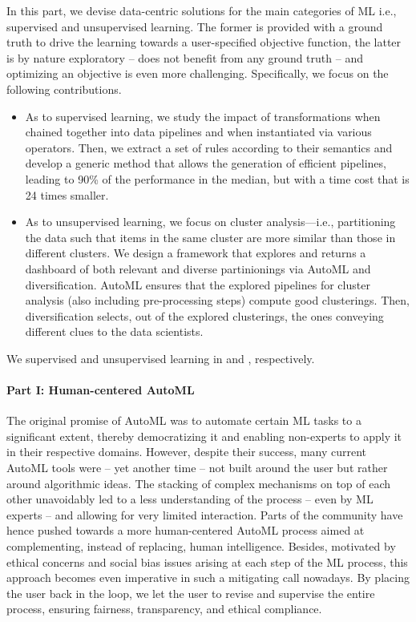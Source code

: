 In this part, we devise data-centric solutions for the main categories of ML i.e., supervised and unsupervised learning.
The former is provided with a ground truth to drive the learning towards a user-specified objective function, the latter is by nature exploratory -- does not benefit from any ground truth -- and optimizing an objective is even more challenging.
Specifically, we focus on the following contributions.
\begin{itemize}
    \item As to supervised learning, we study the impact of transformations when chained together into data pipelines and when instantiated via various operators.
    Then, we extract a set of rules according to their semantics and develop a generic method that allows the generation of efficient pipelines, leading to 90\% of the performance in the median, but with a time cost that is 24 times smaller.
    \item As to unsupervised learning, we focus on cluster analysis---i.e., partitioning the data such that items in the same cluster are more similar than those in different clusters.
    We design a framework that explores and returns a dashboard of both relevant and diverse partinionings via AutoML and diversification.
    AutoML ensures that the explored pipelines for cluster analysis (also including pre-processing steps) compute good clusterings.
    Then, diversification selects, out of the explored clusterings, the ones conveying different clues to the data scientists.
\end{itemize}

We supervised and unsupervised learning in \Cref{} and \Cref{}, respectively.

\paragraph{Part I: Human-centered AutoML}

The original promise of AutoML was to automate certain ML tasks to a significant extent, thereby democratizing it and enabling non-experts to apply it in their respective domains.
However, despite their success, many current AutoML tools were -- yet another time -- not built around the user but rather around algorithmic ideas.
The stacking of complex mechanisms on top of each other unavoidably led to a less understanding of the process -- even by ML experts -- and allowing for very limited interaction.
Parts of the community have hence pushed towards a more human-centered AutoML process aimed at complementing, instead of replacing, human intelligence.
Besides, motivated by ethical concerns and social bias issues arising at each step of the ML process, this approach becomes even imperative in such a mitigating call nowadays.
By placing the user back in the loop, we let the user to revise and supervise the entire process, ensuring fairness, transparency, and ethical compliance.

